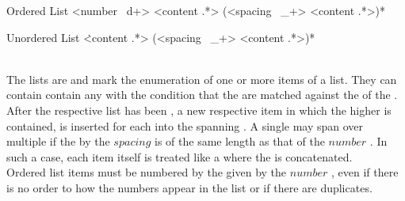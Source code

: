 \begin{identifier}{Ordered List}
<number ~d+> <content .*>
(<spacing ~_+> <content .*>)*
\end{identifier}
\begin{identifier}{Unordered List}
\. <content .*>
(<spacing ~_+> <content .*>)*
\end{identifier}
 \\

The lists are  and mark the enumeration of one or more items of a list. They can contain contain any  with the condition that the  are matched against the  of the . \\

After the respective list  has been , a new respective item  in which the higher   is contained, is inserted for each  into the spanning . A single  may span over multiple  if the   by the \inline$spacing$  is of the same length as that of the \inline$number$ . In such a case, each item  itself is treated like a  where the  is concatenated. \\

Ordered list items must be numbered by the  given by the \inline$number$ , even if there is no order to how the numbers appear in the list or if there are duplicates. \\

